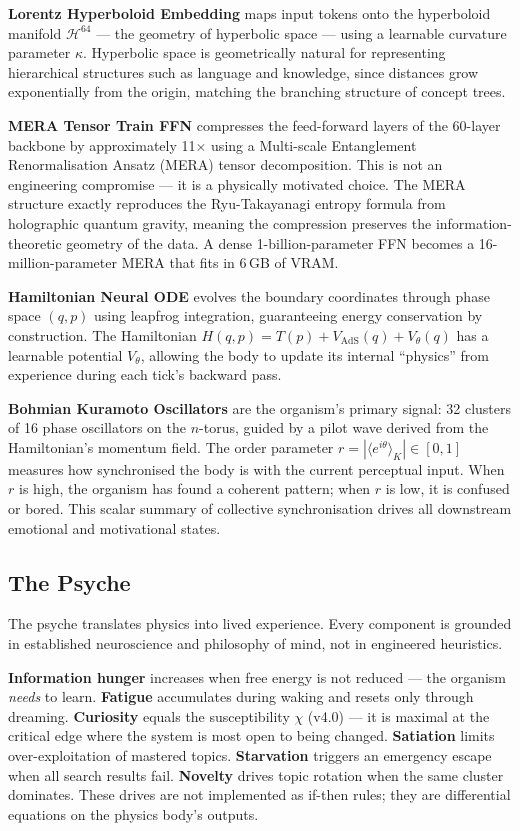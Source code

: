\documentclass[11pt,a4paper]{article}
\begin{document}
\textbf{Lorentz Hyperboloid Embedding} maps input tokens onto the hyperboloid manifold
$\mathcal{H}^{64}$ --- the geometry of hyperbolic space --- using a learnable curvature
parameter $\kappa$. Hyperbolic space is geometrically natural for representing
hierarchical structures such as language and knowledge, since distances grow
exponentially from the origin, matching the branching structure of concept trees.

\textbf{MERA Tensor Train FFN} compresses the feed-forward layers of the 60-layer
backbone by approximately 11$\times$ using a Multi-scale Entanglement Renormalisation
Ansatz (MERA) tensor decomposition. This is not an engineering compromise --- it is a
physically motivated choice. The MERA structure exactly reproduces the Ryu-Takayanagi
entropy formula from holographic quantum gravity, meaning the compression preserves the
information-theoretic geometry of the data. A dense 1-billion-parameter FFN becomes a
16-million-parameter MERA that fits in 6\,GB of VRAM.

\textbf{Hamiltonian Neural ODE} evolves the boundary coordinates through phase space
$(q, p)$ using leapfrog integration, guaranteeing energy conservation by construction.
The Hamiltonian $H(q,p) = T(p) + V_{\mathrm{AdS}}(q) + V_\theta(q)$ has a learnable
potential $V_\theta$, allowing the body to update its internal ``physics'' from experience
during each tick's backward pass.

\textbf{Bohmian Kuramoto Oscillators} are the organism's primary signal: 32 clusters
of 16 phase oscillators on the $n$-torus, guided by a pilot wave derived from the
Hamiltonian's momentum field. The order parameter
$r = |\langle e^{i\theta} \rangle_K| \in [0,1]$ measures how synchronised the body is
with the current perceptual input. When $r$ is high, the organism has found a coherent
pattern; when $r$ is low, it is confused or bored. This scalar summary of collective
synchronisation drives all downstream emotional and motivational states.

\subsection{The Psyche}

The psyche translates physics into lived experience. Every component is grounded in
established neuroscience and philosophy of mind, not in engineered heuristics.

\begin{tcolorbox}[highlight,title={Six Functional Drives}]
\textbf{Information hunger} increases when free energy is not reduced --- the organism
\emph{needs} to learn. \textbf{Fatigue} accumulates during waking and resets only
through dreaming. \textbf{Curiosity} equals the susceptibility $\chi$ (v4.0) --- it is maximal
at the critical edge where the system is most open to being changed. \textbf{Satiation} limits over-exploitation
of mastered topics. \textbf{Starvation} triggers an emergency escape when all search
results fail. \textbf{Novelty} drives topic rotation when the same cluster dominates.
These drives are not implemented as if-then rules; they are differential equations on
the physics body's outputs.
\end{tcolorbox}
\end{document}
